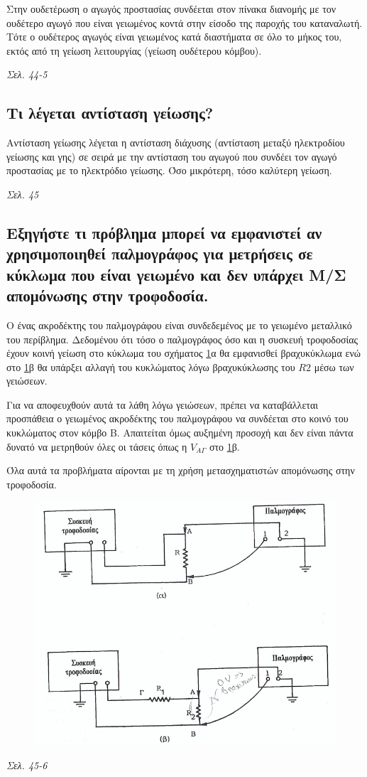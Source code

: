 \documentclass{article}
\begin{document}
Στην ουδετέρωση ο αγωγός προστασίας συνδέεται στον πίνακα διανομής με τον ουδέτερο αγωγό που είναι γειωμένος κοντά στην είσοδο της παροχής του καταναλωτή. Τότε ο ουδέτερος
αγωγός είναι γειωμένος κατά διαστήματα σε όλο το μήκος του, εκτός από τη γείωση λειτουργίας (γείωση ουδέτερου κόμβου).

\emph{Σελ. 44-5}

\subsection{Τι λέγεται αντίσταση γείωσης?}
Αντίσταση γείωσης λέγεται η αντίσταση διάχυσης (αντίσταση μεταξύ ηλεκτροδίου γείωσης και γης) σε σειρά με την αντίσταση του αγωγού που συνδέει τον αγωγό προστασίας με 
το ηλεκτρόδιο γείωσης. Όσο μικρότερη, τόσο καλύτερη γείωση.

\emph{Σελ. 45}

\subsection{Εξηγήστε τι πρόβλημα μπορεί να εμφανιστεί αν χρησιμοποιηθεί παλμογράφος για μετρήσεις σε κύκλωμα που είναι γειωμένο και δεν υπάρχει Μ/Σ απομόνωσης στην
τροφοδοσία.}
Ο ένας ακροδέκτης του παλμογράφου είναι συνδεδεμένος με το γειωμένο μεταλλικό του περίβλημα. Δεδομένου ότι τόσο ο παλμογράφος όσο και η συσκευή τροφοδοσίας έχουν κοινή
γείωση στο κύκλωμα του σχήματος \ref{erwtisi64}α θα εμφανισθεί βραχυκύκλωμα ενώ στο \ref{erwtisi64}β θα υπάρξει αλλαγή του κυκλώματος λόγω βραχυκύκλωσης του $R2$ μέσω 
των γειώσεων.

Για να αποφευχθούν αυτά τα λάθη λόγω γειώσεων, πρέπει να καταβάλλεται προσπάθεια ο γειωμένος ακροδέκτης του παλμογράφου να συνδέεται στο κοινό του κυκλώματος στον κόμβο
Β. Απαιτείται όμως αυξημένη προσοχή και δεν είναι πάντα δυνατό να μετρηθούν όλες οι τάσεις όπως η $V_{A\Gamma}$ στο \ref{erwtisi64}β.

Όλα αυτά τα προβλήματα αίρονται με τη χρήση μετασχηματιστών απομόνωσης στην τροφοδοσία.

\begin{figure}[h!]
    \includegraphics[width=\linewidth]{erwtisi64.png}
    \caption{}
    \label{erwtisi64}
\end{figure}
\emph{Σελ. 45-6}
\end{document}
